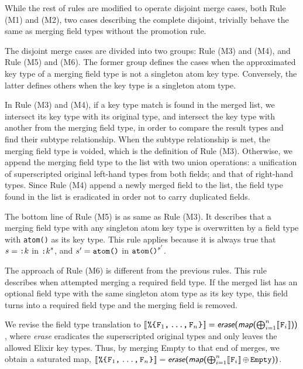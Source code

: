 \documentclass{article}
\begin{document}
While the rest of rules are modified to operate disjoint merge cases, both Rule \textsc{(M1)} and \textsc{(M2)}, two cases describing the complete disjoint, trivially behave the same as merging field types without the promotion rule.

The disjoint merge cases are divided into two groups: Rule \textsc{(M3)} and \textsc{(M4)}, and Rule \textsc{(M5)} and \textsc{(M6)}.
The former group defines the cases when the approximated key type of a merging field type is not a singleton atom key type.
Conversely, the latter defines others when the key type is a singleton atom type.

In Rule \textsc{(M3)} and \textsc{(M4)}, if a key type match is found in the merged list, we intersect its key type with its original type, and intersect the key type with another from the merging field type, in order to compare the result types and find their subtype relationship.
When the subtype relationship is met, the merging field type is voided, which is the definition of Rule \textsc{(M3)}.
Otherwise, we append the merging field type to the list with two union operations: a unification of superscripted original left-hand types from both fields; and that of right-hand types.
Since Rule \textsc{(M4)} append a newly merged field to the list, the field type found in the list is eradicated in order not to carry duplicated fields.

The bottom line of Rule \textsc{(M5)} is as same as Rule \textsc{(M3)}.
It describes that a merging field type with any singleton atom key type is overwritten by a field type with \texttt{atom()} as its key type.
This rule applies because it is always true that $s = \texttt{:$k$}$ in $\texttt{:$k$}^{s}$, and $s^{\prime} = \texttt{atom()}$ in $\texttt{atom()}^{s^{\prime}}$.

The approach of Rule \textsc{(M6)} is different from the previous rules.
This rule describes when attempted merging a required field type.
If the merged list has an optional field type with the same singleton atom type as its key type, this field turns into a required field type and the merging field is removed.

We revise the field type translation to $[\![\hspace{.07em}\texttt{\%\{}\hspace{.07em}\mbox{\ensuremath{\texttt{\texttt{F}$_1$,\,...,\,\texttt{F}$_n$}}}\hspace{.07em}\texttt{\}}\hspace{.07em}]\!] = \textsf{\textsl{erase}(\textsl{map}($\bigoplus_{i=1}^{n}$$[\![\hspace{.07em}\texttt{F}_i\hspace{.07em}]\!]$))}$, where \textsl{erase} eradicates the superscripted original types and only leaves the allowed Elixir key types. Thus, by merging \textsf{Empty} to that end of merges, we obtain a saturated map, $[\![\hspace{.07em}\texttt{\%\{}\hspace{.07em}\mbox{\ensuremath{\texttt{\texttt{F}$_1$,\,...,\,\texttt{F}$_n$}}}\hspace{.07em}\texttt{\}}\hspace{.07em}]\!] =\textsf{\textsl{erase}(\textsl{map}($\bigoplus_{i=1}^{n}$$[\![\hspace{.07em}\texttt{F}_i\hspace{.07em}]\!]$$\,\oplus\,\texttt{Empty}$))}$.
\end{document}
